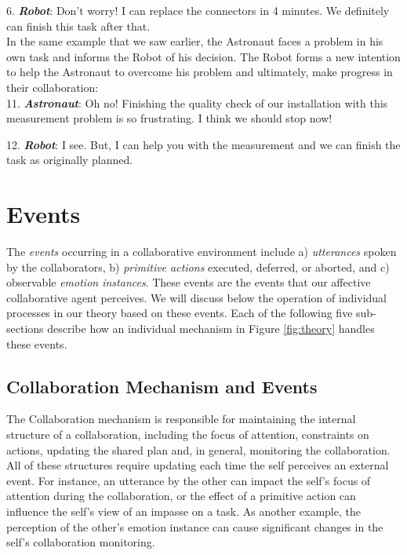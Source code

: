 \documentclass[12pt]{report}
\begin{document}
  6. \textbf{\textit{Robot}}: Don't worry! I can replace the connectors in 4
  minutes. We definitely can finish this task after that.\\
  
In the same example that we saw earlier, the Astronaut faces a problem in his
own task and informs the Robot of his decision. The Robot forms a new intention
to help the Astronaut to overcome his problem and ultimately, make progress in
their collaboration:\\
 
  11. \textbf{\textit{Astronaut}}: Oh no! Finishing the quality check of our
  installation with this measurement problem is so frustrating. I think we
  should stop now!

  12. \textbf{\textit{Robot}}: I see. But, I can help you with the measurement  
  and we can finish the task as originally planned.

\section{Events}
\label{sec:events}

The \textit{events} occurring in a collaborative environment include a)
\textit{utterances} spoken by the collaborators, b) \textit{primitive actions}
executed, deferred, or aborted, and c) observable \textit{emotion instances}.
These events are the events that our affective collaborative agent perceives. We
will discuss below the operation of individual processes in our theory based on
these events. Each of the following five sub-sections describe how an individual
mechanism in Figure \ref{fig:theory} handles these events.

\subsection{Collaboration Mechanism and Events}

The Collaboration mechanism is responsible for maintaining the internal
structure of a collaboration, including the focus of attention, constraints on
actions, updating the shared plan and, in general, monitoring the collaboration.
All of these structures require updating each time the self perceives an
external event. For instance, an utterance by the other can impact the self's
focus of attention during the collaboration, or the effect of a primitive action
can influence the self's view of an impasse on a task. As another example, the
perception of the other's emotion instance can cause significant changes in the
self's collaboration monitoring.
\end{document}
